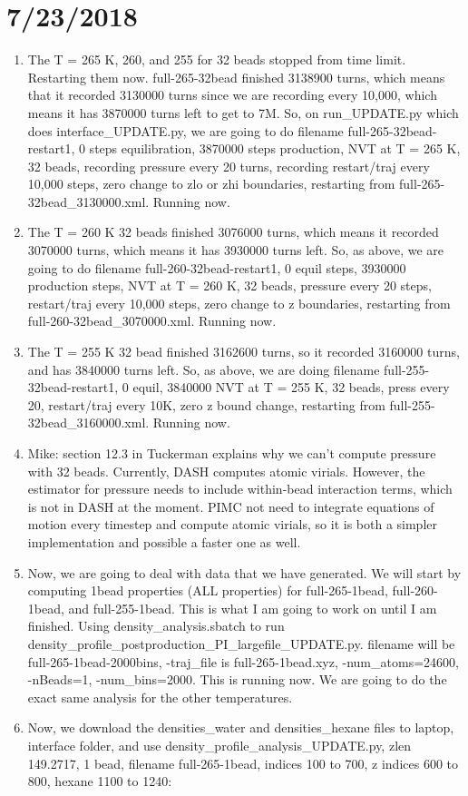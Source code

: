 \documentclass[12pt,reqno]{amsart}
\numberwithin{equation}{section}
\begin{document}
\section{7/23/2018}
\begin{enumerate}
\item The T = 265 K, 260, and 255 for 32 beads stopped from time limit.  Restarting them now.  full-265-32bead finished 3138900 turns, which means that it recorded 3130000 turns since we are recording every 10,000, which means it has 3870000 turns left to get to 7M.  So, on run\_UPDATE.py which does interface\_UPDATE.py, we are going to do filename full-265-32bead-restart1,  0 steps equilibration, 3870000 steps production, NVT at T = 265 K, 32 beads, recording pressure every 20 turns, recording restart/traj every 10,000 steps, zero change to zlo or zhi boundaries, restarting from full-265-32bead\_3130000.xml.  Running now. 
\item The T = 260 K 32 beads finished 3076000 turns, which means it recorded 3070000 turns, which means it has 3930000 turns left.  So, as above, we are going to do filename full-260-32bead-restart1, 0 equil steps, 3930000 production steps, NVT at T = 260 K, 32 beads, pressure every 20 steps, restart/traj every 10,000 steps, zero change to z boundaries, restarting from full-260-32bead\_3070000.xml.  Running now.  
\item The T = 255 K 32 bead finished 3162600 turns, so it recorded 3160000 turns, and has 3840000 turns left.  So, as above, we are doing filename full-255-32bead-restart1, 0 equil, 3840000 NVT at T = 255 K, 32 beads, press every 20, restart/traj every 10K, zero z bound change, restarting from full-255-32bead\_3160000.xml.  Running now.  
\item Mike: section 12.3 in Tuckerman explains why we can't compute pressure with 32 beads.  Currently, DASH computes atomic virials.  However, the estimator for pressure needs to include within-bead interaction terms, which is not in DASH at the moment.  PIMC not need to integrate equations of motion every timestep and compute atomic virials, so it is both a simpler implementation and possible a faster one as well.  
\item Now, we are going to deal with data that we have generated.  We will start by computing 1bead properties (ALL properties) for full-265-1bead, full-260-1bead, and full-255-1bead.  This is what I am going to work on until I am finished.  Using density\_analysis.sbatch to run density\_profile\_postproduction\_PI\_largefile\_UPDATE.py.  filename will be full-265-1bead-2000bins, -traj\_file is full-265-1bead.xyz, -num\_atoms=24600, -nBeads=1,   -num\_bins=2000.  This is running now.  We are going to do the exact same analysis for the other temperatures.  
\item Now, we download the densities\_water and densities\_hexane files to laptop, interface folder, and use density\_profile\_analysis\_UPDATE.py, zlen 149.2717, 1 bead, filename full-265-1bead, indices 100 to 700, z indices 600 to 800, hexane 1100 to 1240:


\end{enumerate}
\end{document}
